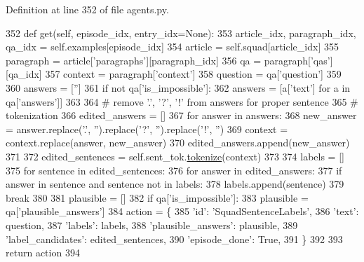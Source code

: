 Definition at line 352 of file agents.\+py.


\begin{DoxyCode}
352     \textcolor{keyword}{def }get(self, episode\_idx, entry\_idx=None):
353         article\_idx, paragraph\_idx, qa\_idx = self.examples[episode\_idx]
354         article = self.squad[article\_idx]
355         paragraph = article[\textcolor{stringliteral}{'paragraphs'}][paragraph\_idx]
356         qa = paragraph[\textcolor{stringliteral}{'qas'}][qa\_idx]
357         context = paragraph[\textcolor{stringliteral}{'context'}]
358         question = qa[\textcolor{stringliteral}{'question'}]
359 
360         answers = [\textcolor{stringliteral}{''}]
361         \textcolor{keywordflow}{if} \textcolor{keywordflow}{not} qa[\textcolor{stringliteral}{'is\_impossible'}]:
362             answers = [a[\textcolor{stringliteral}{'text'}] \textcolor{keywordflow}{for} a \textcolor{keywordflow}{in} qa[\textcolor{stringliteral}{'answers'}]]
363 
364         \textcolor{comment}{# remove '.', '?', '!' from answers for proper sentence}
365         \textcolor{comment}{# tokenization}
366         edited\_answers = []
367         \textcolor{keywordflow}{for} answer \textcolor{keywordflow}{in} answers:
368             new\_answer = answer.replace(\textcolor{stringliteral}{'.'}, \textcolor{stringliteral}{''}).replace(\textcolor{stringliteral}{'?'}, \textcolor{stringliteral}{''}).replace(\textcolor{stringliteral}{'!'}, \textcolor{stringliteral}{''})
369             context = context.replace(answer, new\_answer)
370             edited\_answers.append(new\_answer)
371 
372         edited\_sentences = self.sent\_tok.\hyperlink{namespaceparlai_1_1agents_1_1tfidf__retriever_1_1build__tfidf_a1fdb457e98eb4e4c26047e229686a616}{tokenize}(context)
373 
374         labels = []
375         \textcolor{keywordflow}{for} sentence \textcolor{keywordflow}{in} edited\_sentences:
376             \textcolor{keywordflow}{for} answer \textcolor{keywordflow}{in} edited\_answers:
377                 \textcolor{keywordflow}{if} answer \textcolor{keywordflow}{in} sentence \textcolor{keywordflow}{and} sentence \textcolor{keywordflow}{not} \textcolor{keywordflow}{in} labels:
378                     labels.append(sentence)
379                     \textcolor{keywordflow}{break}
380 
381         plausible = []
382         \textcolor{keywordflow}{if} qa[\textcolor{stringliteral}{'is\_impossible'}]:
383             plausible = qa[\textcolor{stringliteral}{'plausible\_answers'}]
384         action = \{
385             \textcolor{stringliteral}{'id'}: \textcolor{stringliteral}{'SquadSentenceLabels'},
386             \textcolor{stringliteral}{'text'}: question,
387             \textcolor{stringliteral}{'labels'}: labels,
388             \textcolor{stringliteral}{'plausible\_answers'}: plausible,
389             \textcolor{stringliteral}{'label\_candidates'}: edited\_sentences,
390             \textcolor{stringliteral}{'episode\_done'}: \textcolor{keyword}{True},
391         \}
392 
393         \textcolor{keywordflow}{return} action
394 \end{DoxyCode}


